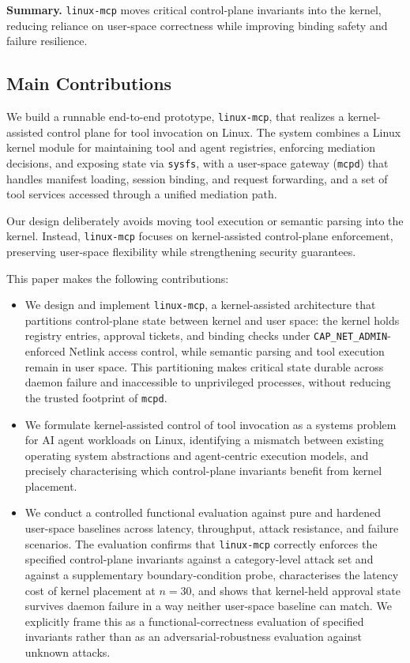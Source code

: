 \noindent
\textbf{Summary.}
\texttt{linux-mcp} moves critical control-plane invariants into the kernel, reducing reliance on user-space correctness while improving binding safety and failure resilience.




\subsection{Main Contributions}

We build a runnable end-to-end prototype, \texttt{linux-mcp}, that realizes a kernel-assisted control plane for tool invocation on Linux. 
The system combines a Linux kernel module for maintaining tool and agent registries, enforcing mediation decisions, and exposing state via \texttt{sysfs}, with a user-space gateway (\texttt{mcpd}) that handles manifest loading, session binding, and request forwarding, and a set of tool services accessed through a unified mediation path.

Our design deliberately avoids moving tool execution or semantic parsing into the kernel. 
Instead, \texttt{linux-mcp} focuses on kernel-assisted control-plane enforcement, preserving user-space flexibility while strengthening security guarantees.

This paper makes the following contributions:
\begin{itemize}

    \item We design and implement \texttt{linux-mcp}, a kernel-assisted architecture that partitions control-plane state between kernel and user space: the kernel holds registry entries, approval tickets, and binding checks under \texttt{CAP\_NET\_ADMIN}-enforced Netlink access control, while semantic parsing and tool execution remain in user space. This partitioning makes critical state durable across daemon failure and inaccessible to unprivileged processes, without reducing the trusted footprint of \texttt{mcpd}.

    \item We formulate kernel-assisted control of tool invocation as a systems problem for AI agent workloads on Linux, identifying a mismatch between existing operating system abstractions and agent-centric execution models, and precisely characterising which control-plane invariants benefit from kernel placement.

    \item We conduct a controlled functional evaluation against pure and hardened user-space baselines across latency, throughput, attack resistance, and failure scenarios. The evaluation confirms that \texttt{linux-mcp} correctly enforces the specified control-plane invariants against a category-level attack set and against a supplementary boundary-condition probe, characterises the latency cost of kernel placement at $n = 30$, and shows that kernel-held approval state survives daemon failure in a way neither user-space baseline can match. We explicitly frame this as a functional-correctness evaluation of specified invariants rather than as an adversarial-robustness evaluation against unknown attacks.
\end{itemize}
